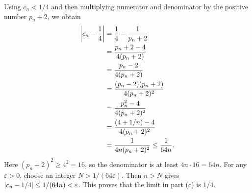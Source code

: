 Using $c_n<1/4$ and then multiplying numerator and denominator
by the positive number $p_n+2$, we obtain
\begin{align*}
 \left|c_n-\frac14\right|
 &=\frac14-\frac1{p_n+2}\\
 &=\frac{p_n+2-4}{4(p_n+2)}\\
 &=\frac{p_n-2}{4(p_n+2)}\\
 &=\frac{(p_n-2)(p_n+2)}{4(p_n+2)^2}\\
 &=\frac{p_n^2-4}{4(p_n+2)^2}\\
 &=\frac{(4+1/n)-4}{4(p_n+2)^2}\\
 &=\frac1{4n(p_n+2)^2}
 \le\frac1{64n}.
\end{align*}
Here $(p_n+2)^2\ge4^2=16$, so the denominator is at least
$4n\cdot16=64n$. For any $\varepsilon>0$, choose an integer
$N>1/(64\varepsilon)$. Then $n>N$ gives
$\left|c_n-1/4\right|\le1/(64n)<\varepsilon$.
This proves that the limit in part \textup{(c)} is $1/4$.

